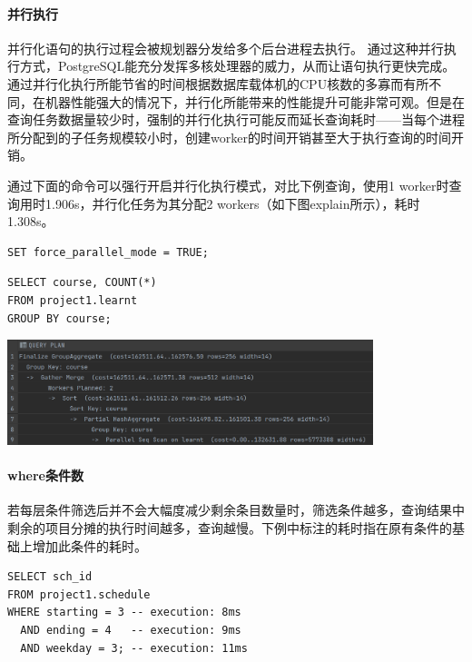 \paragraph{并行执行}
\par 并行化语句的执行过程会被规划器分发给多个后台进程去执行。 通过这种并行执行方式，PostgreSQL能充分发挥多核处理器的威力，从而让语句执行更快完成。通过并行化执行所能节省的时间根据数据库载体机的CPU核数的多寡而有所不同，在机器性能强大的情况下，并行化所能带来的性能提升可能非常可观。但是在查询任务数据量较少时，强制的并行化执行可能反而延长查询耗时——当每个进程所分配到的子任务规模较小时，创建worker的时间开销甚至大于执行查询的时间开销。
\par 通过下面的命令可以强行开启并行化执行模式，对比下例查询，使用1 worker时查询用时1.906s，并行化任务为其分配2 workers（如下图explain所示），耗时1.308s。
\begin{lstlisting}
SET force_parallel_mode = TRUE;
\end{lstlisting}
\vspace{-2em}
\begin{lstlisting}
SELECT course, COUNT(*)
FROM project1.learnt
GROUP BY course;
\end{lstlisting}
\vspace{-2em}
\centerline{\includegraphics[width=0.8\textwidth]{dta/parall}}

\paragraph{where条件数} 若每层条件筛选后并不会大幅度减少剩余条目数量时，筛选条件越多，查询结果中剩余的项目分摊的执行时间越多，查询越慢。下例中标注的耗时指在原有条件的基础上增加此条件的耗时。
\begin{lstlisting}
SELECT sch_id
FROM project1.schedule
WHERE starting = 3 -- execution: 8ms
  AND ending = 4   -- execution: 9ms
  AND weekday = 3; -- execution: 11ms
\end{lstlisting}
\vspace{-2em}
